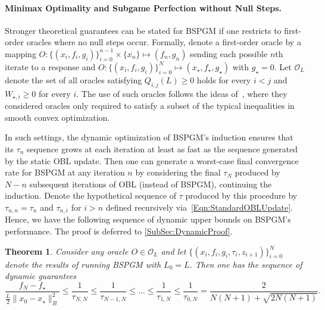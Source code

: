 \documentclass[11pt]{article}
\numberwithin{equation}{section}
\newtheorem{theorem}[thm]{Theorem}
\theoremstyle{definition}
\theoremstyle{plain}
\theoremstyle{definition}
\begin{document}
\paragraph{Minimax Optimality and Subgame Perfection without Null Steps.} Stronger theoretical guarantees can be stated for BSPGM if one restricts to first-order oracles where no null steps occur. Formally, denote a first-order oracle by a mapping $O \colon \{(x_i,f_i,g_i)\}_{i=0}^{n-1}\times \{x_n\}\mapsto (f_n,g_n)$ sending each possible $n$th iterate to a response and $O \colon \{(x_i,f_i,g_i)\}_{i=0}^{N} \mapsto (x_\star,f_\star,g_\star)$ with $g_\star=0$. Let $\mathcal{O}_{L}$ denote the set of all oracles satisfying $Q_{i,j}(L)\geq 0$ holds for every $i<j$ and $W_{\star, i} \geq 0$ for every $i$. The use of such oracles follows the ideas of~\cite{OBL}, where they considered oracles only required to satisfy a subset of the typical inequalities in smooth convex optimization.

In such settings, the dynamic optimization of BSPGM's induction ensures that its $\tau_n$ sequence grows at each iteration at least as fast as the sequence generated by the static OBL update. Then one can generate a worst-case final convergence rate for BSPGM at any iteration $n$ by considering the final $\tau_N$ produced by $N-n$ subsequent iterations of OBL (instead of BSPGM), continuing the induction. Denote the hypothetical sequence of $\tau$ produced by this procedure by $\tau_{n,n}=\tau_n$ and $\tau_{n,i}$ for $i>n$ defined recursively via~\eqref{Eqn:StandardOBLUpdate}. Hence, we have the following sequence of dynamic upper bounds on BSPGM's performance. The proof is deferred to \cref{SubSec:DynamicProof}. 

\begin{theorem} \label{Thm:DynamicGuarantees}
    Consider any oracle $O\in\mathcal{O}_L$ and let $\{(x_i,f_i,g_i,\tau_i,z_{i+1})\}_{i=0}^N$ denote the results of running BSPGM with $L_0=L$. Then one has the sequence of dynamic guarantees
    \begin{equation*}
    \frac{f_N - f_\star}{\frac{L}{2}\|x_0-x_\star\|^2_B} \leq \frac{1}{\tau_{N,N}} \leq \frac{1}{\tau_{N-1,N}} \leq \dots \leq \frac{1}{\tau_{1,N}} \leq \frac{1}{\tau_{0,N}} = \frac{2}{N(N+1) + \sqrt{2N(N+1)} }.
    \end{equation*}
\end{theorem}
\end{document}
